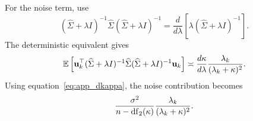 For the noise term, use
\begin{equation}
    (\widehat{\Sigma}+\lambda I)^{-1}\widehat{\Sigma}
    (\widehat{\Sigma}+\lambda I)^{-1}
    =
    \frac{d}{d\lambda}\left[\lambda(\widehat{\Sigma}+\lambda I)^{-1}\right].
\end{equation}
The deterministic equivalent gives
\begin{equation}
    \mathbb{E}\left[
    \mathbf{u}_k^\top
    (\widehat{\Sigma}+\lambda I)^{-1}\widehat{\Sigma}
    (\widehat{\Sigma}+\lambda I)^{-1}
    \mathbf{u}_k
    \right]
    \asymp
    \frac{d\kappa}{d\lambda}
    \frac{\lambda_k}{(\lambda_k+\kappa)^2}.
\end{equation}
Using equation~\eqref{eq:app_dkappa}, the noise contribution becomes
\begin{equation}
    \frac{\sigma^2}{n-\mathrm{df}_{2}(\kappa)}
    \frac{\lambda_k}{(\lambda_k+\kappa)^2}.
    \label{eq:app_noise_term}
\end{equation}


